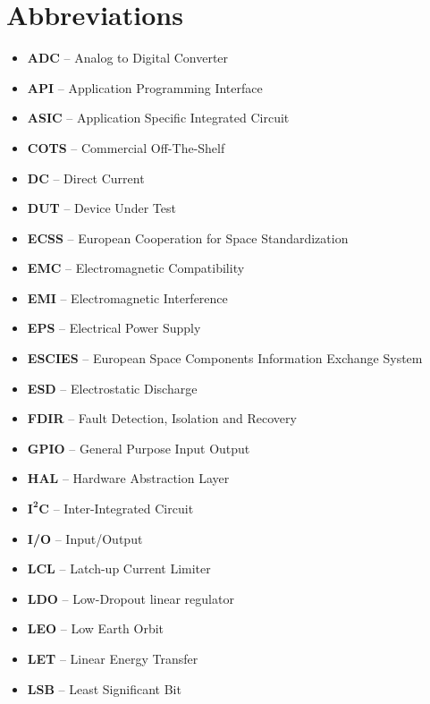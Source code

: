 \chapter{Abbreviations}

\begin{itemize}
    \item    \textbf{ADC}      --    Analog to Digital Converter
    \item    \textbf{API}      --    Application Programming Interface
    \item    \textbf{ASIC}     --    Application Specific Integrated Circuit
    \item    \textbf{COTS}     --    Commercial Off-The-Shelf
    \item    \textbf{DC}       --    Direct Current
    \item    \textbf{DUT}      --    Device Under Test
    \item    \textbf{ECSS}     --    European Cooperation for Space Standardization
    \item    \textbf{EMC}      --    Electromagnetic Compatibility
    \item    \textbf{EMI}      --    Electromagnetic Interference
    \item    \textbf{EPS}      --    Electrical Power Supply
    \item    \textbf{ESCIES}   --    European Space Components Information Exchange System
    \item    \textbf{ESD}      --    Electrostatic Discharge
    \item    \textbf{FDIR}     --    Fault Detection, Isolation and Recovery
    \item    \textbf{GPIO}     --    General Purpose Input Output
    \item    \textbf{HAL}      --    Hardware Abstraction Layer
    \item    \textbf{$\mathbf{I^2C}$}   --    Inter-Integrated Circuit
    \item    \textbf{I/O}      --    Input/Output
    \item    \textbf{LCL}      --    Latch-up Current Limiter
    \item    \textbf{LDO}      --    Low-Dropout linear regulator
    \item    \textbf{LEO}      --    Low Earth Orbit
    \item    \textbf{LET}      --    Linear Energy Transfer
    \item    \textbf{LSB}      --    Least Significant Bit

\end{itemize}
